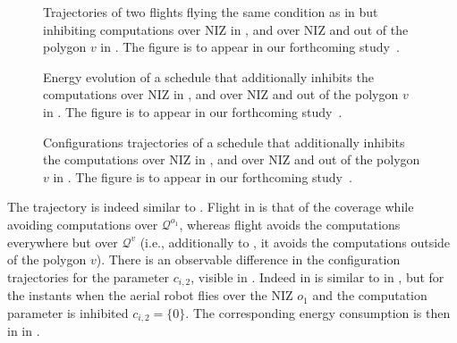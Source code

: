 \begin{figure}[p!]
  \centering
  \selectfont
  \footnotesize    
  
  \caption[The trajectory effect of inhibiting computations over NIZ and out of the polygon]{Trajectories of two flights flying the same condition as  in  but inhibiting computations over NIZ in , and over NIZ and out of the polygon $v$ in . The figure is to appear in our forthcoming study~\citep{seewald202Xenergy}.}
  \label{fig:trajs-niz}
\end{figure}
\begin{figure}[p!]
  \centering
  \selectfont
  \footnotesize    
  
  \caption[Energy effect of inhibiting computations over NIZ and out of the polygon]{Energy evolution of a schedule that additionally inhibits the computations over NIZ in , and over NIZ and out of the polygon $v$ in . The figure is to appear in our forthcoming study~\citep{seewald202Xenergy}.}
  \label{fig:ener-niz}
\end{figure}
\begin{figure}[p!]
  \centering
  \selectfont
  \footnotesize    
  
  \caption[Configuration effect of inhibiting computations over NIZ and out of the polygon]{Configurations trajectories of a schedule that additionally inhibits the computations over NIZ in , and over NIZ and out of the polygon $v$ in . The figure is to appear in our forthcoming study~\citep{seewald202Xenergy}.}
  \label{fig:ctls-niz}
\end{figure}

The trajectory is indeed similar to . Flight  in  is that of the coverage while avoiding computations over $\mathcal{Q}^{o_1}$, whereas flight  avoids the computations everywhere but over $\mathcal{Q}^v$ (i.e., additionally to , it avoids the computations outside of the polygon $v$). There is an observable difference in the configuration trajectories for the parameter $c_{i,2}$, visible in . Indeed  in  is similar to  in , but for the instants when the aerial robot flies over the NIZ $o_1$ and the computation parameter is inhibited $c_{i,2}=\{0\}$. The corresponding energy consumption is then in  in .

